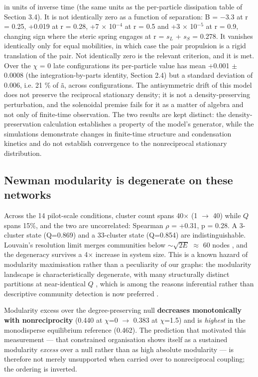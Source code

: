 \documentclass[aps,pre,preprint,superscriptaddress,nofootinbib,longbibliography]{revtex4-2}
\begin{document}
in units of inverse time (the same units as the per-particle dissipation table of Section 3.4). It is not identically zero as a function of separation: B = $-$3.3 at r = 0.25, +0.019 at r = 0.28, +7 $\times$ 10$^{-4}$ at r = 0.5 and +3 $\times$ 10$^{-5}$ at r = 0.9, changing sign where the steric spring engages at r = $s_{L}$ + $s_{S}$ = 0.278. It vanishes identically only for equal mobilities, in which case the pair propulsion is a rigid translation of the pair. Not identically zero is the relevant criterion, and it is met. Over the $\chi$ = 0 late configurations its per-particle value has mean +0.001 $\pm$ 0.0008 (the integration-by-parts identity, Section 2.4) but a standard deviation of 0.006, i.e. 21 \% of ã, across configurations. The antisymmetric drift of this model does not preserve the reciprocal stationary density; it is not a density-preserving perturbation, and the solenoidal premise fails for it as a matter of algebra and not only of finite-time observation. The two results are kept distinct: the density-preservation calculation establishes a property of the model's generator, while the simulations demonstrate changes in finite-time structure and condensation kinetics and do not establish convergence to the nonreciprocal stationary distribution.

\subsection{Newman modularity is degenerate on these networks}

Across the 14 pilot-scale conditions, cluster count spans 40$\times$ (1 $\rightarrow$ 40) while $Q$ spans 15\%, and the two are uncorrelated: Spearman $\rho$ = +0.31, p = 0.28. A 3-cluster state (Q=0.869) and a 33-cluster state (Q=0.854) are indistinguishable. Louvain's resolution limit merges communities below $\sim \sqrt{2E}$ $\approx$ 60 nodes \cite{r4}, and the degeneracy survives a 4$\times$ increase in system size. This is a known hazard of modularity maximisation rather than a peculiarity of our graphs: the modularity landscape is characteristically degenerate, with many structurally distinct partitions at near-identical $Q$ \cite{r23}, which is among the reasons inferential rather than descriptive community detection is now preferred \cite{r24}.

Modularity excess over the degree-preserving null \textbf{decreases monotonically with nonreciprocity} (0.440 at $\chi$=0 $\rightarrow$ 0.383 at $\chi$=1.5) and is \emph{highest} in the monodisperse equilibrium reference (0.462). The prediction that motivated this measurement --- that constrained organisation shows itself as a sustained modularity \emph{excess} over a null rather than as high absolute modularity \cite{r30} --- is therefore not merely unsupported when carried over to nonreciprocal coupling; the ordering is inverted.
\end{document}

